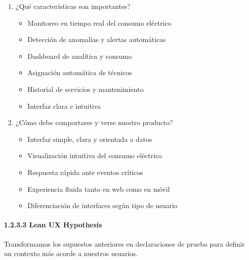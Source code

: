 \begin{enumerate}
  Cómo:

  \begin{itemize}
  \tightlist
  \item
    A través de una aplicación web o móvil
  \item
    Visualizando dashboards de consumo
  \item
    Recibiendo alertas automáticas
  \item
    Gestionando solicitudes de servicio
  \end{itemize}
\item
  ¿Qué características son importantes?

  \begin{itemize}
  \tightlist
  \item
    Monitoreo en tiempo real del consumo eléctrico
  \item
    Detección de anomalías y alertas automáticas
  \item
    Dashboard de analítica y consumo
  \item
    Asignación automática de técnicos
  \item
    Historial de servicios y mantenimiento
  \item
    Interfaz clara e intuitiva
  \end{itemize}
\item
  ¿Cómo debe comportarse y verse nuestro producto?

  \begin{itemize}
  \tightlist
  \item
    Interfaz simple, clara y orientada a datos
  \item
    Visualización intuitiva del consumo eléctrico
  \item
    Respuesta rápida ante eventos críticos
  \item
    Experiencia fluida tanto en web como en móvil
  \item
    Diferenciación de interfaces según tipo de usuario
  \end{itemize}
\end{enumerate}

\paragraph{1.2.3.3 Lean UX
Hypothesis}\label{report__10-cap1-introduccion.md__lean-ux-hypothesis}

\hfill\break
Transformamos los supuestos anteriores en declaraciones de prueba para
definir un contexto más acorde a nuestros usuarios.

